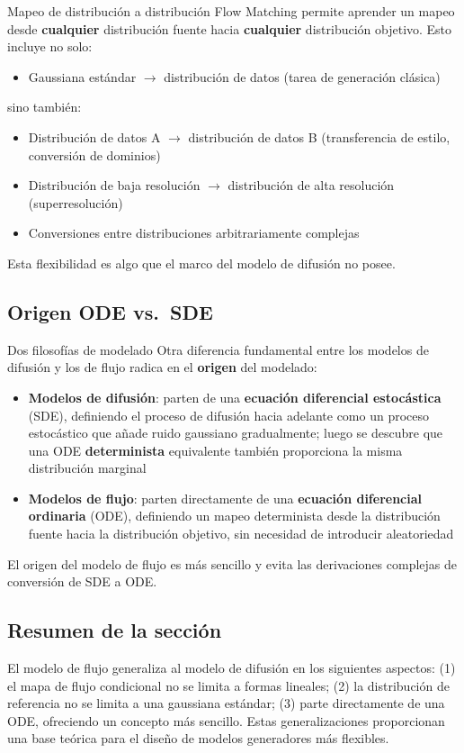 \begin{importantbox}{Mapeo de distribución a distribución}
Flow Matching permite aprender un mapeo desde \textbf{cualquier} distribución fuente hacia \textbf{cualquier} distribución objetivo. Esto incluye no solo:
\begin{itemize}
    \item Gaussiana estándar $\to$ distribución de datos (tarea de generación clásica)
\end{itemize}
sino también:
\begin{itemize}
    \item Distribución de datos A $\to$ distribución de datos B (transferencia de estilo, conversión de dominios)
    \item Distribución de baja resolución $\to$ distribución de alta resolución (superresolución)
    \item Conversiones entre distribuciones arbitrariamente complejas
\end{itemize}
Esta flexibilidad es algo que el marco del modelo de difusión no posee.
\end{importantbox}

\subsection{Origen ODE vs.\ SDE}

\begin{knowledgebox}{Dos filosofías de modelado}
Otra diferencia fundamental entre los modelos de difusión y los de flujo radica en el \textbf{origen} del modelado:
\begin{itemize}
    \item \textbf{Modelos de difusión}: parten de una \textbf{ecuación diferencial estocástica} (SDE), definiendo el proceso de difusión hacia adelante como un proceso estocástico que añade ruido gaussiano gradualmente; luego se descubre que una ODE \textbf{determinista} equivalente también proporciona la misma distribución marginal
    \item \textbf{Modelos de flujo}: parten directamente de una \textbf{ecuación diferencial ordinaria} (ODE), definiendo un mapeo determinista desde la distribución fuente hacia la distribución objetivo, sin necesidad de introducir aleatoriedad
\end{itemize}
El origen del modelo de flujo es más sencillo y evita las derivaciones complejas de conversión de SDE a ODE.
\end{knowledgebox}

\subsection{Resumen de la sección}

El modelo de flujo generaliza al modelo de difusión en los siguientes aspectos: (1) el mapa de flujo condicional no se limita a formas lineales; (2) la distribución de referencia no se limita a una gaussiana estándar; (3) parte directamente de una ODE, ofreciendo un concepto más sencillo. Estas generalizaciones proporcionan una base teórica para el diseño de modelos generadores más flexibles.

